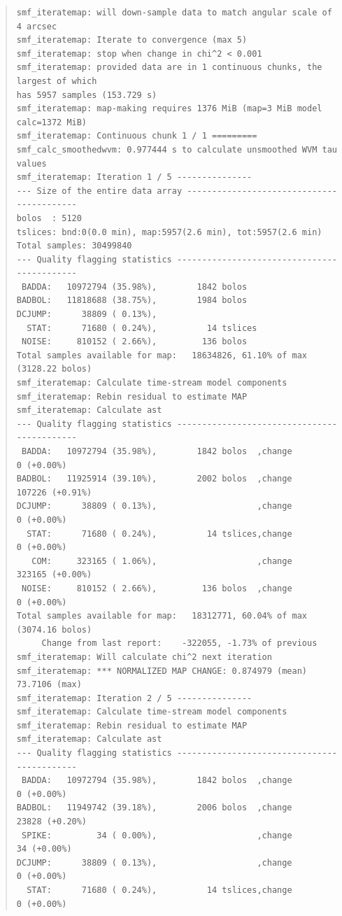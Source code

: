 \documentclass[twoside,11pt]{article}
\renewcommand{\_}{\texttt{\symbol{95}}}
\newenvironment{myquote}{
   \color{MidnightBlue}\begin{quote}\begin{small}}{
   \end{small}\end{quote}
}
\renewenvironment{myquote}{
      \begin{quote}\begin{small}}{
      \end{small}\end{quote}
   }
\begin{document}
\begin{myquote}
\begin{verbatim}
smf_iteratemap: will down-sample data to match angular scale of 4 arcsec
smf_iteratemap: Iterate to convergence (max 5)
smf_iteratemap: stop when change in chi^2 < 0.001
smf_iteratemap: provided data are in 1 continuous chunks, the largest of which
has 5957 samples (153.729 s)
smf_iteratemap: map-making requires 1376 MiB (map=3 MiB model calc=1372 MiB)
smf_iteratemap: Continuous chunk 1 / 1 =========
smf_calc_smoothedwvm: 0.977444 s to calculate unsmoothed WVM tau values
smf_iteratemap: Iteration 1 / 5 ---------------
--- Size of the entire data array ------------------------------------------
bolos  : 5120
tslices: bnd:0(0.0 min), map:5957(2.6 min), tot:5957(2.6 min)
Total samples: 30499840
--- Quality flagging statistics --------------------------------------------
 BADDA:   10972794 (35.98%),        1842 bolos
BADBOL:   11818688 (38.75%),        1984 bolos
DCJUMP:      38809 ( 0.13%),
  STAT:      71680 ( 0.24%),          14 tslices
 NOISE:     810152 ( 2.66%),         136 bolos
Total samples available for map:   18634826, 61.10% of max (3128.22 bolos)
smf_iteratemap: Calculate time-stream model components
smf_iteratemap: Rebin residual to estimate MAP
smf_iteratemap: Calculate ast
--- Quality flagging statistics --------------------------------------------
 BADDA:   10972794 (35.98%),        1842 bolos  ,change          0 (+0.00%)
BADBOL:   11925914 (39.10%),        2002 bolos  ,change     107226 (+0.91%)
DCJUMP:      38809 ( 0.13%),                    ,change          0 (+0.00%)
  STAT:      71680 ( 0.24%),          14 tslices,change          0 (+0.00%)
   COM:     323165 ( 1.06%),                    ,change     323165 (+0.00%)
 NOISE:     810152 ( 2.66%),         136 bolos  ,change          0 (+0.00%)
Total samples available for map:   18312771, 60.04% of max (3074.16 bolos)
     Change from last report:    -322055, -1.73% of previous
smf_iteratemap: Will calculate chi^2 next iteration
smf_iteratemap: *** NORMALIZED MAP CHANGE: 0.874979 (mean) 73.7106 (max)
smf_iteratemap: Iteration 2 / 5 ---------------
smf_iteratemap: Calculate time-stream model components
smf_iteratemap: Rebin residual to estimate MAP
smf_iteratemap: Calculate ast
--- Quality flagging statistics --------------------------------------------
 BADDA:   10972794 (35.98%),        1842 bolos  ,change          0 (+0.00%)
BADBOL:   11949742 (39.18%),        2006 bolos  ,change      23828 (+0.20%)
 SPIKE:         34 ( 0.00%),                    ,change         34 (+0.00%)
DCJUMP:      38809 ( 0.13%),                    ,change          0 (+0.00%)
  STAT:      71680 ( 0.24%),          14 tslices,change          0 (+0.00%)

\end{verbatim}
\end{myquote}
\end{document}
